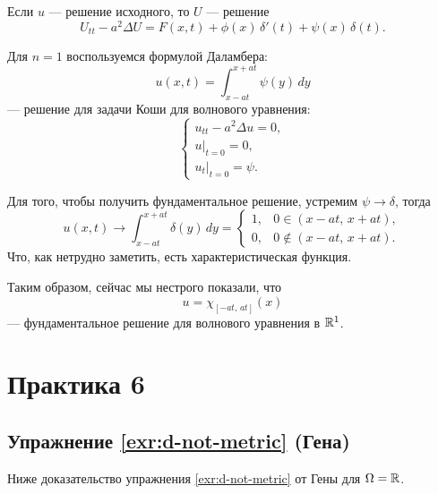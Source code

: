 \documentclass[12pt,a4paper]{article}
\begin{document}
Если \(u\) --- решение исходного, то \(U\) --- решение
\[
U_{tt}-a^2\Delta U
=
F(x,t)+\phi(x)\, \delta'(t)+\psi(x)\, \delta(t).
\]


Для \(n=1\) воспользуемся формулой Даламбера:
\[
u(x,t)=\int_{x-at}^{x+at}\psi(y)\, dy
\]
--- решение для задачи Коши для волнового уравнения:
\[
\begin{cases}
u_{tt}-a^2\Delta u=0, \\
u\big|_{t=0}=0, \\
u_t\big|_{t=0}=\psi.
\end{cases}
\]

Для того, чтобы получить фундаментальное решение, устремим \(\psi\to\delta\), тогда
\[
u(x,t)
\to
\int_{x-at}^{x+at}\delta(y)\, dy
=
\begin{cases}
1, & 0\in(x-at,\, x+at), \\
0, & 0\notin(x-at,\, x+at).
\end{cases}
\]
Что, как нетрудно заметить, есть характеристическая функция.

Таким образом, сейчас мы нестрого показали, что
\[
u=\chi_{[-at,\, at]}(x)
\]
--- фундаментальное решение для волнового уравнения в \(\mathbb{R}^1\).


\pagebreak
\section{Практика 6}
\renewcommand{\notesheader}{Математическая физика \(\cdot\) Практика 6 \(\cdot\) 09.10}

\subsection{Упражнение \ref{exr:d-not-metric} (Гена)}
\label{ex:1.3:solved}

Ниже доказательство упражнения \ref{exr:d-not-metric} от Гены для \(\Omega=\mathbb{R}\).


\begin{center}
\end{center}
\end{document}
